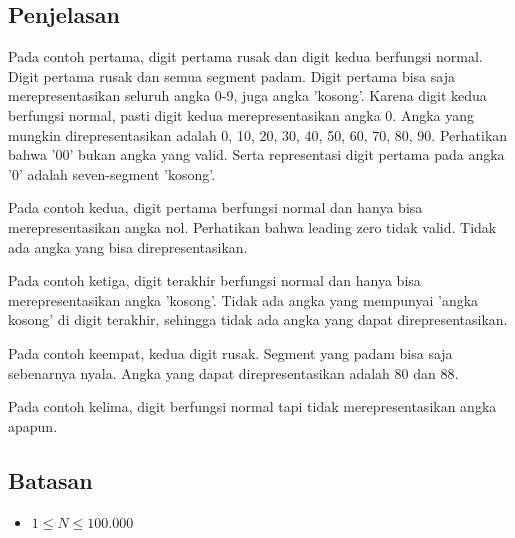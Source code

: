 \documentclass{article}
\begin{document}
\subsection*{Penjelasan}
\par\noindent 
Pada contoh pertama, digit pertama rusak dan digit kedua berfungsi normal. Digit pertama rusak dan semua segment padam. Digit pertama bisa saja merepresentasikan seluruh angka 0-9, juga angka 'kosong'. Karena digit kedua berfungsi normal, pasti digit kedua merepresentasikan angka 0. Angka yang mungkin direpresentasikan adalah 0, 10, 20, 30, 40, 50, 60, 70, 80, 90. Perhatikan bahwa '00' bukan angka yang valid. Serta representasi digit pertama pada angka '0' adalah seven-segment 'kosong'. 
\newline
\par\noindent 
Pada contoh kedua, digit pertama berfungsi normal dan hanya bisa merepresentasikan angka nol. Perhatikan bahwa leading zero tidak valid. Tidak ada angka yang bisa direpresentasikan.
\newline
\par\noindent 
Pada contoh ketiga, digit terakhir berfungsi normal dan hanya bisa merepresentasikan angka 'kosong'. Tidak ada angka yang mempunyai 'angka kosong' di digit terakhir, sehingga tidak ada angka yang dapat direpresentasikan.
\newline
\par\noindent 
Pada contoh keempat, kedua digit rusak. Segment yang padam bisa saja sebenarnya nyala. Angka yang dapat direpresentasikan adalah 80 dan 88.
\newline
\par\noindent 
Pada contoh kelima, digit berfungsi normal tapi tidak merepresentasikan angka apapun. 

\subsection*{Batasan}

\begin{itemize}
	\item $1 \leq N \leq 100.000$
\end{itemize}
\end{document}
